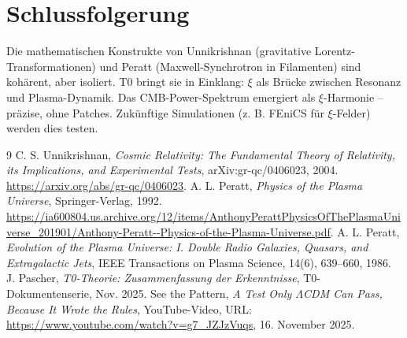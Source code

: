 	\section{Schlussfolgerung}
	Die mathematischen Konstrukte von Unnikrishnan (gravitative Lorentz-Transformationen) und Peratt (Maxwell-Synchrotron in Filamenten) sind kohärent, aber isoliert. T0 bringt sie in Einklang: $\xi$ als Brücke zwischen Resonanz und Plasma-Dynamik. Das CMB-Power-Spektrum emergiert als $\xi$-Harmonie -- präzise, ohne Patches. Zukünftige Simulationen (z. B. FEniCS für $\xi$-Felder) werden dies testen.
	\begin{thebibliography}{9}
		C. S. Unnikrishnan, \textit{Cosmic Relativity: The Fundamental Theory of Relativity, its Implications, and Experimental Tests},
		arXiv:gr-qc/0406023, 2004.
		\url{https://arxiv.org/abs/gr-qc/0406023}.
		A. L. Peratt, \textit{Physics of the Plasma Universe},
		Springer-Verlag, 1992.
		\url{https://ia600804.us.archive.org/12/items/AnthonyPerattPhysicsOfThePlasmaUniverse_201901/Anthony-Peratt--Physics-of-the-Plasma-Universe.pdf}.
		A. L. Peratt, \textit{Evolution of the Plasma Universe: I. Double Radio Galaxies, Quasars, and Extragalactic Jets},
		IEEE Transactions on Plasma Science, 14(6), 639--660, 1986.
		J. Pascher, \textit{T0-Theorie: Zusammenfassung der Erkenntnisse},
		T0-Dokumentenserie, Nov. 2025.
		See the Pattern, \textit{A Test Only $\Lambda$CDM Can Pass, Because It Wrote the Rules},
		YouTube-Video, URL: \url{https://www.youtube.com/watch?v=g7_JZJzVuqs},
		16. November 2025.
	\end{thebibliography}
